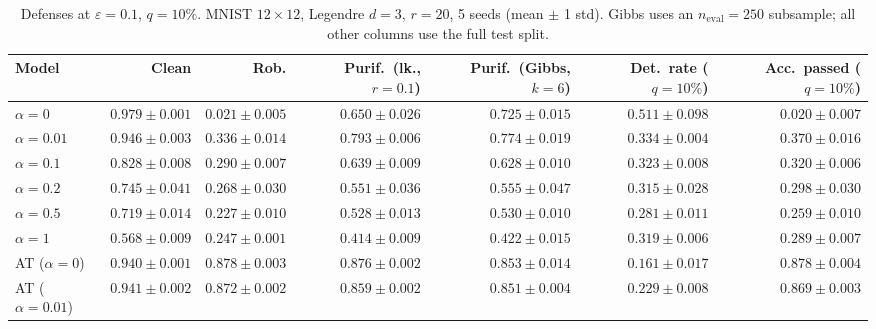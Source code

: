 \begin{table}[htbp]
  \centering
  \small
  \begin{tabular}{@{}lrrrrrr@{}}
    \toprule
    Model & Clean & Rob. & Purif.\ (lk., $r{=}0.1$) & Purif.\ (Gibbs, $k{=}6$) & Det.\ rate ($q{=}10\%$) & Acc.\ passed ($q{=}10\%$) \\
    \midrule
    $\alpha{=}0$ & $\mathbf{0.979 \pm 0.001}$ & $0.021 \pm 0.005$ & $0.650 \pm 0.026$ & $0.725 \pm 0.015$ & $\mathbf{0.511 \pm 0.098}$ & $0.020 \pm 0.007$ \\
    $\alpha{=}0.01$ & $0.946 \pm 0.003$ & $0.336 \pm 0.014$ & $0.793 \pm 0.006$ & $0.774 \pm 0.019$ & $0.334 \pm 0.004$ & $0.370 \pm 0.016$ \\
    $\alpha{=}0.1$ & $0.828 \pm 0.008$ & $0.290 \pm 0.007$ & $0.639 \pm 0.009$ & $0.628 \pm 0.010$ & $0.323 \pm 0.008$ & $0.320 \pm 0.006$ \\
    $\alpha{=}0.2$ & $0.745 \pm 0.041$ & $0.268 \pm 0.030$ & $0.551 \pm 0.036$ & $0.555 \pm 0.047$ & $0.315 \pm 0.028$ & $0.298 \pm 0.030$ \\
    $\alpha{=}0.5$ & $0.719 \pm 0.014$ & $0.227 \pm 0.010$ & $0.528 \pm 0.013$ & $0.530 \pm 0.010$ & $0.281 \pm 0.011$ & $0.259 \pm 0.010$ \\
    $\alpha{=}1$ & $0.568 \pm 0.009$ & $0.247 \pm 0.001$ & $0.414 \pm 0.009$ & $0.422 \pm 0.015$ & $0.319 \pm 0.006$ & $0.289 \pm 0.007$ \\
    AT ($\alpha{=}0$) & $0.940 \pm 0.001$ & $\mathbf{0.878 \pm 0.003}$ & $\mathbf{0.876 \pm 0.002}$ & $\mathbf{0.853 \pm 0.014}$ & $0.161 \pm 0.017$ & $\mathbf{0.878 \pm 0.004}$ \\
    AT ($\alpha{=}0.01$) & $0.941 \pm 0.002$ & $0.872 \pm 0.002$ & $0.859 \pm 0.002$ & $0.851 \pm 0.004$ & $0.229 \pm 0.008$ & $0.869 \pm 0.003$ \\
    \bottomrule
  \end{tabular}
  \caption{Defenses at $\varepsilon=0.1$, $q{=}10\%$. MNIST $12\times12$, Legendre $d{=}3$, $r{=}20$, 5 seeds (mean $\pm$ 1 std). Gibbs uses an $n_{\mathrm{eval}}=250$ subsample; all other columns use the full test split.}
  \label{tab:mnist_r12_models_r20_eps0.1}
\end{table}
